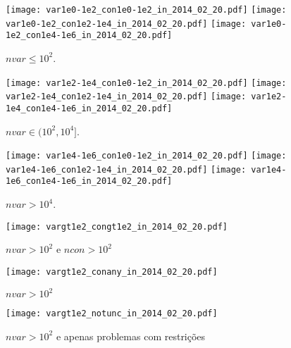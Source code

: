 \documentclass{article}
\begin{document}
\begin{figure}[H]
\centering
\texttt{[image: var1e0-1e2\_con1e0-1e2\_in\_2014\_02\_20.pdf]}
\texttt{[image: var1e0-1e2\_con1e2-1e4\_in\_2014\_02\_20.pdf]}
\texttt{[image: var1e0-1e2\_con1e4-1e6\_in\_2014\_02\_20.pdf]}
\caption{ $nvar \leq 10^2$. }
\label{fig:nvar_small}
\end{figure}
\begin{figure}[H]
\centering
\texttt{[image: var1e2-1e4\_con1e0-1e2\_in\_2014\_02\_20.pdf]}
\texttt{[image: var1e2-1e4\_con1e2-1e4\_in\_2014\_02\_20.pdf]}
\texttt{[image: var1e2-1e4\_con1e4-1e6\_in\_2014\_02\_20.pdf]}
\caption{ $nvar \in (10^2,10^4]$. }
\label{fig:nvar_medium}
\end{figure}
\begin{figure}[H]
\centering
\texttt{[image: var1e4-1e6\_con1e0-1e2\_in\_2014\_02\_20.pdf]}
\texttt{[image: var1e4-1e6\_con1e2-1e4\_in\_2014\_02\_20.pdf]}
\texttt{[image: var1e4-1e6\_con1e4-1e6\_in\_2014\_02\_20.pdf]}
\caption{ $nvar > 10^4$. }
\label{fig:nvar_big}
\end{figure}

\begin{figure}[H]
\centering
\texttt{[image: vargt1e2\_congt1e2\_in\_2014\_02\_20.pdf]}
\caption{ $nvar > 10^2$ e $ncon > 10^2$ }
\label{fig:both_medium_and_big}
\end{figure}

\begin{figure}[H]
\centering
\texttt{[image: vargt1e2\_conany\_in\_2014\_02\_20.pdf]}
\caption{ $nvar > 10^2$ }
\label{fig:nvar_medium_and_big}
\end{figure}

\begin{figure}[H]
\centering
\texttt{[image: vargt1e2\_notunc\_in\_2014\_02\_20.pdf]}
\caption{ $nvar > 10^2$ e apenas problemas com restrições }
\label{fig:nvar_medium_and_big_not_unc}
\end{figure}
\end{document}
